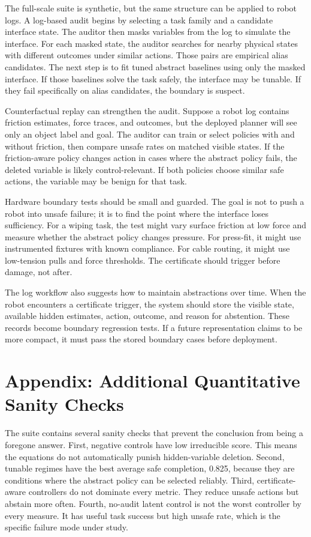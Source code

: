 \documentclass{article}
\begin{document}
The full-scale suite is synthetic, but the same structure can be applied to robot
logs. A log-based audit begins by selecting a task family and a candidate
interface state. The auditor then masks variables from the log to simulate the
interface. For each masked state, the auditor searches for nearby physical states
with different outcomes under similar actions. Those pairs are empirical alias
candidates. The next step is to fit tuned abstract baselines using only the
masked interface. If those baselines solve the task safely, the interface may be
tunable. If they fail specifically on alias candidates, the boundary is suspect.

Counterfactual replay can strengthen the audit. Suppose a robot log contains
friction estimates, force traces, and outcomes, but the deployed planner will see
only an object label and goal. The auditor can train or select policies with and
without friction, then compare unsafe rates on matched visible states. If the
friction-aware policy changes action in cases where the abstract policy fails,
the deleted variable is likely control-relevant. If both policies choose similar
safe actions, the variable may be benign for that task.

Hardware boundary tests should be small and guarded. The goal is not to push a
robot into unsafe failure; it is to find the point where the interface loses
sufficiency. For a wiping task, the test might vary surface friction at low force
and measure whether the abstract policy changes pressure. For press-fit, it might
use instrumented fixtures with known compliance. For cable routing, it might use
low-tension pulls and force thresholds. The certificate should trigger before
damage, not after.

The log workflow also suggests how to maintain abstractions over time. When the
robot encounters a certificate trigger, the system should store the visible
state, available hidden estimates, action, outcome, and reason for abstention.
These records become boundary regression tests. If a future representation claims
to be more compact, it must pass the stored boundary cases before deployment.

\section{Appendix: Additional Quantitative Sanity Checks}

The suite contains several sanity checks that prevent the conclusion from being a
foregone answer. First, negative controls have low irreducible score. This means
the equations do not automatically punish hidden-variable deletion. Second,
tunable regimes have the best average safe completion, 0.825, because they are
conditions where the abstract policy can be selected reliably. Third,
certificate-aware controllers do not dominate every metric. They reduce unsafe
actions but abstain more often. Fourth, no-audit latent control is not the worst
controller by every measure. It has useful task success but high unsafe rate,
which is the specific failure mode under study.
\end{document}
